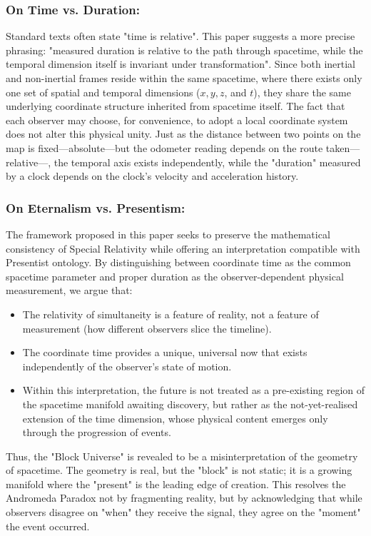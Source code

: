\documentclass[pdflatex,sn-basic]{sn-jnl}
\theoremstyle{thmstyleone}%
\theoremstyle{thmstyletwo}%
\theoremstyle{thmstylethree}%
\begin{document}
	\subsubsection{On Time vs. Duration:}\label{subsubsec5_2_2}
	Standard texts often state "time is relative". This paper suggests a more precise phrasing: "measured duration is relative to the path through spacetime, while the temporal dimension itself is invariant under transformation". Since both inertial and non-inertial frames reside within the same spacetime, where there exists only one set of spatial and temporal dimensions ($x, y, z$, and $t$), they share the same underlying coordinate structure inherited from spacetime itself. The fact that each observer may choose, for convenience, to adopt a local coordinate system does not alter this physical unity. Just as the distance between two points on the map is fixed—absolute—but the odometer reading depends on the route taken—relative—, the temporal axis exists independently, while the "duration" measured by a clock depends on the clock's velocity and acceleration history.
	\subsubsection{On Eternalism vs. Presentism:}\label{subsubsec5_2_3}
	The framework proposed in this paper seeks to preserve the mathematical consistency of Special Relativity while offering an interpretation compatible with Presentist ontology. By distinguishing between coordinate time as the common spacetime parameter and proper duration as the observer-dependent physical measurement, we argue that:
		\begin{itemize}
			\item The relativity of simultaneity is a feature of reality, not a feature of measurement (how different observers slice the timeline).
			\item The coordinate time provides a unique, universal now that exists independently of the observer's state of motion.
			\item Within this interpretation, the future is not treated as a pre-existing region of the spacetime manifold awaiting discovery, but rather as the not-yet-realised extension of the time dimension, whose physical content emerges only through the progression of events.
 		\end{itemize}
	Thus, the "Block Universe" is revealed to be a misinterpretation of the geometry of spacetime. The geometry is real, but the "block" is not static; it is a growing manifold where the "present" is the leading edge of creation. This resolves the Andromeda Paradox not by fragmenting reality, but by acknowledging that while observers disagree on "when" they receive the signal, they agree on the "moment" the event occurred.
\end{document}
